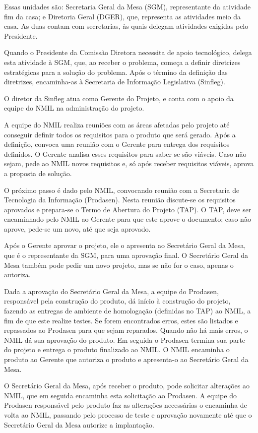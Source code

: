 Essas unidades são: Secretaria Geral da Mesa (SGM), representante da atividade fim da casa; e Diretoria Geral (DGER), que, representa as atividades meio da casa. As duas contam com secretarias, às quais delegam atividades exigidas pelo Presidente.

Quando o Presidente da Comissão Diretora necessita de apoio tecnológico, delega esta
atividade à SGM, que, ao receber o problema, começa a definir diretrizes estratégicas para a solução do problema. Após o término da definição das diretrizes, encaminha-as à Secretaria de Informação Legislativa (Sinfleg).

O diretor da Sinfleg atua como Gerente do Projeto, e conta com o apoio da equipe do
NMIL na administração do projeto.

A equipe do NMIL realiza reuniões com as áreas afetadas pelo projeto até conseguir
definir todos os requisitos para o produto que será gerado. Após a definição, convoca uma reunião com o Gerente para entrega dos requisitos definidos. O Gerente analisa esses requisitos para saber se são viáveis. Caso não sejam, pede ao NMIL novos requisitos e, só após receber requisitos viáveis, aprova a proposta de solução.

O próximo passo é dado pelo NMIL, convocando reunião com a Secretaria de Tecnologia da Informação (Prodasen). Nesta reunião discute-se os requisitos aprovados e prepara-se o Termo de Abertura do Projeto (TAP). O TAP, deve ser encaminhado pelo NMIL ao Gerente para que este aprove o documento; caso não aprove, pede-se um novo, até que seja aprovado.

Após o Gerente aprovar o projeto, ele o apresenta ao Secretário Geral da Mesa, que é o representante da SGM, para uma aprovação final. O Secretário Geral da Mesa também pode pedir um novo projeto, mas se não for o caso, apenas o autoriza.

Dada a aprovação do Secretário Geral da Mesa, a equipe do Prodasen, responsável pela
construção do produto, dá início à construção do projeto, fazendo as entregas de ambiente de homologação (definidas no TAP) ao NMIL, a fim de que este realize testes. Se forem encontrados erros, estes são listados e repassados ao Prodasen para que sejam reparados. Quando não há mais erros, o NMIL dá sua aprovação do produto. Em seguida o Prodasen termina sua parte do projeto e entrega o produto finalizado ao NMIL. O NMIL encaminha o produto ao
Gerente que autoriza o produto e apresenta-o ao Secretário Geral da Mesa.

O Secretário Geral da Mesa, após receber o produto, pode solicitar alterações ao NMIL,
que em seguida encaminha esta solicitação ao Prodasen. A equipe do Prodasen responsável pelo produto faz as alterações necessárias o encaminha de volta ao NMIL, passando pelo processo de teste e aprovação novamente até que o Secretário Geral da Mesa autorize a implantação.

